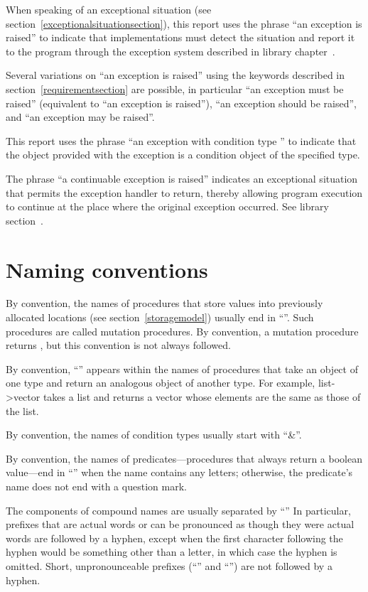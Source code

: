 When speaking of an exceptional situation (see section~\ref{exceptionalsituationsection}), this
report uses the phrase ``an exception is raised'' to indicate
that implementations must detect the situation and report it to the
program through the exception system described in
library chapter~.

Several variations on ``an exception is raised'' using the keywords
described in section~\ref{requirementsection} are possible, in
particular ``an exception must be raised'' (equivalent to ``an
exception is raised''), ``an exception should be raised'', and ``an
exception may be raised''.

This report uses the phrase ``an exception with condition type ''
to indicate that the object provided with the
exception is a condition object of the specified type.

The phrase ``a continuable exception is raised'' indicates an
exceptional situation that permits the exception handler to return,
thereby allowing program execution to continue at the place where the
original exception occurred.  See library
section~.

\section{Naming conventions}

By convention, the names of procedures that store values into previously
allocated locations (see section~\ref{storagemodel}) usually end in
``\ide{!}''.
Such procedures are called mutation procedures.
By convention, a mutation procedure returns
\unspecifiedreturn,
but this convention is not always followed.

By convention, ``\ide{->}'' appears within the names of procedures that
take an object of one type and return an analogous object of another type.
For example, {\cf list->vector} takes a list and returns a vector whose
elements are the same as those of the list.

By convention, the names of condition types usually start with
``{\cf\&}''.

By convention, the names of predicates---procedures that always return
a boolean value---end in ``'' when the name contains any
letters; otherwise, the predicate's name does not end with a question
mark.

The components of compound names are usually separated by ``\ide{-}''
In particular, prefixes that are actual words or can be pronounced as
though they were actual words are followed by a hyphen, except when
the first character following the hyphen would be something other than
a letter, in which case the hyphen is omitted.  Short,
unpronounceable prefixes (``'' and ``'') are not
followed by a hyphen.

